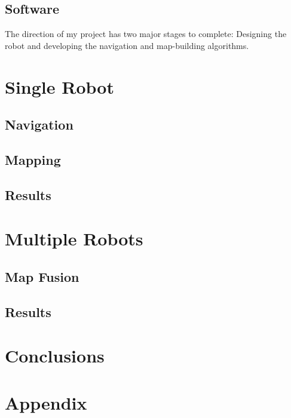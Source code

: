 \documentclass[letterpaper, oneside, 10pt]{report}
\begin{document}
\section{Software}

The direction of my project has two major stages to complete: Designing the robot and developing the navigation and map-building algorithms. \\


\chapter{Single Robot}
\section{Navigation}
\section{Mapping}
\section{Results}

\chapter{Multiple Robots}
\section{Map Fusion}


\section{Results}

\chapter{Conclusions}

\chapter{Appendix}

\clearpage



\end{document}
